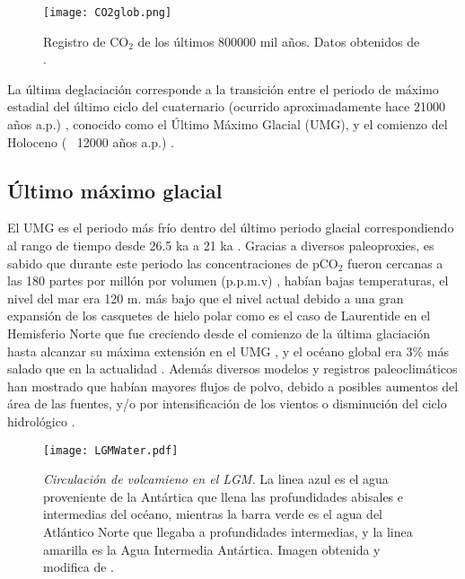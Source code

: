 \begin{figure}[H]
\centering
 \texttt{[image: CO2glob.png]}
 \caption[Registro de CO$_2$, últimos 800 mil años]{Registro de CO$_2$ de los últimos 800000 mil años. Datos obtenidos de \citep{luthi2008high}. }
  \label{fig:CO2}
\end{figure}

La última deglaciación corresponde a la transición entre el periodo de máximo estadial del último ciclo del cuaternario (ocurrido aproximadamente hace 21000 años a.p.) \citep{clark2009last}, conocido como el Último Máximo Glacial (UMG), y el comienzo del Holoceno (\string~ 12000 años  a.p.) \citep{sigman2000glacial,barker2009interhemispheric}.


\subsection{\'Ultimo m\'aximo glacial}
 
 El UMG es el periodo más frío dentro del último periodo glacial correspondiendo al rango de tiempo desde 26.5 ka a 21 ka \citep{clark2009last}. Gracias a diversos paleoproxies, es sabido que durante este periodo 
las concentraciones de pCO$_2$ fueron cercanas a las 180 partes por millón por volumen (p.p.m.v) \citep{luthi2008high}, habían bajas temperaturas, el nivel del mar era 120 m. más bajo que el nivel
 actual \citep{fairbanks198917,denton2010last,lambeck2014sea} debido a una gran expansión de los casquetes de hielo polar como es el caso de Laurentide en el Hemisferio Norte que fue creciendo desde el comienzo de la última glaciación hasta alcanzar su máxima extensión en el UMG \citep{fairbanks198917}, y el océano global era 3\% más salado que en la actualidad \citep{sigman2000glacial,bopp2003dust}. Además diversos modelos y registros paleoclimáticos han mostrado que habían mayores flujos de polvo, debido a posibles aumentos del área de las fuentes, y/o por intensificación de los vientos o disminución del ciclo hidrológico \citep{mahowald1999dust,lambert2008dust,maher2010global}. 

\begin{figure}[H]
\centering
 \texttt{[image: LGMWater.pdf]}
 \caption[Circulación de volcamieno en el LGM]{\textit{Circulación de volcamieno en el LGM.} La linea azul es el agua proveniente de la Antártica que llena las profundidades abisales e intermedias del océano, mientras la barra verde es el agua del Atlántico Norte que llegaba a profundidades intermedias, y la linea amarilla es la Agua Intermedia Antártica. Imagen obtenida y modifica de \citep{ferrari2014antarctic}.  } 
\label{fig:aguaCO2}
\end{figure}

